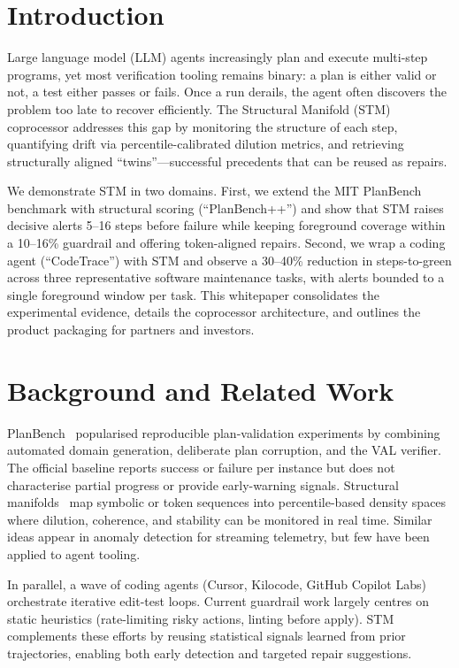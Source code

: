 \documentclass[11pt]{article}
\begin{document}
\newpage

\section{Introduction}
Large language model (LLM) agents increasingly plan and execute multi-step programs, yet most verification tooling remains binary: a plan is either valid or not, a test either passes or fails. Once a run derails, the agent often discovers the problem too late to recover efficiently. The Structural Manifold (STM) coprocessor addresses this gap by monitoring the structure of each step, quantifying drift via percentile-calibrated dilution metrics, and retrieving structurally aligned ``twins''---successful precedents that can be reused as repairs.

We demonstrate STM in two domains. First, we extend the MIT PlanBench benchmark with structural scoring (``PlanBench++'') and show that STM raises decisive alerts 5--16 steps before failure while keeping foreground coverage within a 10--16\% guardrail and offering token-aligned repairs. Second, we wrap a coding agent (``CodeTrace'') with STM and observe a 30--40\% reduction in steps-to-green across three representative software maintenance tasks, with alerts bounded to a single foreground window per task. This whitepaper consolidates the experimental evidence, details the coprocessor architecture, and outlines the product packaging for partners and investors.

\section{Background and Related Work}
PlanBench~\cite{planbench} popularised reproducible plan-validation experiments by combining automated domain generation, deliberate plan corruption, and the VAL verifier. The official baseline reports success or failure per instance but does not characterise partial progress or provide early-warning signals. Structural manifolds~\cite{stm-manifold} map symbolic or token sequences into percentile-based density spaces where dilution, coherence, and stability can be monitored in real time. Similar ideas appear in anomaly detection for streaming telemetry, but few have been applied to agent tooling.

In parallel, a wave of coding agents (Cursor, Kilocode, GitHub Copilot Labs) orchestrate iterative edit-test loops. Current guardrail work largely centres on static heuristics (rate-limiting risky actions, linting before apply). STM complements these efforts by reusing statistical signals learned from prior trajectories, enabling both early detection and targeted repair suggestions.
\end{document}
